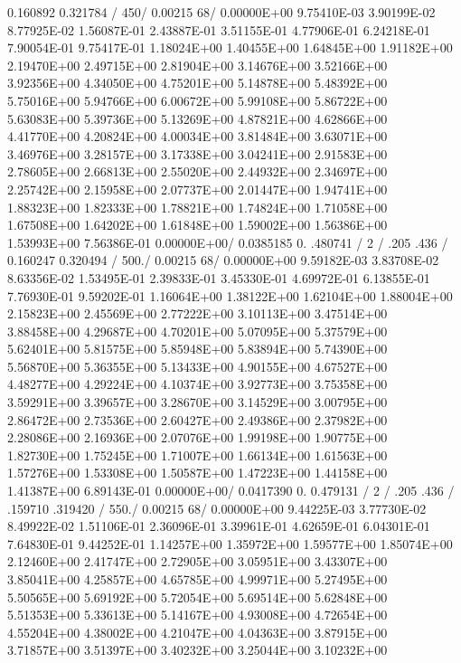 \begin{ccode}
   0.160892    0.321784 /
 450/
 0.00215 68/
  0.00000E+00  9.75410E-03  3.90199E-02  8.77925E-02  1.56087E-01
  2.43887E-01  3.51155E-01  4.77906E-01  6.24218E-01  7.90054E-01
  9.75417E-01  1.18024E+00  1.40455E+00  1.64845E+00  1.91182E+00
  2.19470E+00  2.49715E+00  2.81904E+00  3.14676E+00  3.52166E+00
  3.92356E+00  4.34050E+00  4.75201E+00  5.14878E+00  5.48392E+00
  5.75016E+00  5.94766E+00  6.00672E+00  5.99108E+00  5.86722E+00
  5.63083E+00  5.39736E+00  5.13269E+00  4.87821E+00  4.62866E+00
  4.41770E+00  4.20824E+00  4.00034E+00  3.81484E+00  3.63071E+00
  3.46976E+00  3.28157E+00  3.17338E+00  3.04241E+00  2.91583E+00
  2.78605E+00  2.66813E+00  2.55020E+00  2.44932E+00  2.34697E+00
  2.25742E+00  2.15958E+00  2.07737E+00  2.01447E+00  1.94741E+00
  1.88323E+00  1.82333E+00  1.78821E+00  1.74824E+00  1.71058E+00
  1.67508E+00  1.64202E+00  1.61848E+00  1.59002E+00  1.56386E+00
  1.53993E+00  7.56386E-01  0.00000E+00/
    0.0385185  0.  .480741 /
    2 /
   .205  .436 /
    0.160247   0.320494 /
 500./
 0.00215 68/
  0.00000E+00  9.59182E-03  3.83708E-02  8.63356E-02  1.53495E-01
  2.39833E-01  3.45330E-01  4.69972E-01  6.13855E-01  7.76930E-01
  9.59202E-01  1.16064E+00  1.38122E+00  1.62104E+00  1.88004E+00
  2.15823E+00  2.45569E+00  2.77222E+00  3.10113E+00  3.47514E+00
  3.88458E+00  4.29687E+00  4.70201E+00  5.07095E+00  5.37579E+00
  5.62401E+00  5.81575E+00  5.85948E+00  5.83894E+00  5.74390E+00
  5.56870E+00  5.36355E+00  5.13433E+00  4.90155E+00  4.67527E+00
  4.48277E+00  4.29224E+00  4.10374E+00  3.92773E+00  3.75358E+00
  3.59291E+00  3.39657E+00  3.28670E+00  3.14529E+00  3.00795E+00
  2.86472E+00  2.73536E+00  2.60427E+00  2.49386E+00  2.37982E+00
  2.28086E+00  2.16936E+00  2.07076E+00  1.99198E+00  1.90775E+00
  1.82730E+00  1.75245E+00  1.71007E+00  1.66134E+00  1.61563E+00
  1.57276E+00  1.53308E+00  1.50587E+00  1.47223E+00  1.44158E+00
  1.41387E+00  6.89143E-01  0.00000E+00/
    0.0417390  0.      0.479131    /
    2 /
   .205  .436 /
    .159710  .319420 /
 550./
 0.00215 68/
  0.00000E+00  9.44225E-03  3.77730E-02  8.49922E-02  1.51106E-01
  2.36096E-01  3.39961E-01  4.62659E-01  6.04301E-01  7.64830E-01
  9.44252E-01  1.14257E+00  1.35972E+00  1.59577E+00  1.85074E+00
  2.12460E+00  2.41747E+00  2.72905E+00  3.05951E+00  3.43307E+00
  3.85041E+00  4.25857E+00  4.65785E+00  4.99971E+00  5.27495E+00
  5.50565E+00  5.69192E+00  5.72054E+00  5.69514E+00  5.62848E+00
  5.51353E+00  5.33613E+00  5.14167E+00  4.93008E+00  4.72654E+00
  4.55204E+00  4.38002E+00  4.21047E+00  4.04363E+00  3.87915E+00
  3.71857E+00  3.51397E+00  3.40232E+00  3.25044E+00  3.10232E+00

\end{ccode}
